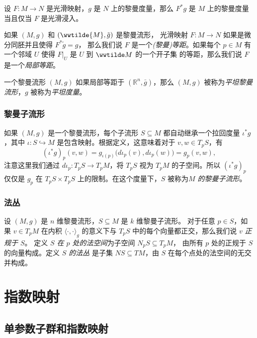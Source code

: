 \documentclass[fontset=none]{Notes}
\begin{document}
\begin{proposition}[拉回度量判别法]
  设 $F:M\to N$ 是光滑映射，$g$ 是 $N$ 上的黎曼度量，那么 
  $F^*g$ 是 $M$ 上的黎曼度量当且仅当 $F$ 是光滑浸入。
\end{proposition}

如果 $(M,g)$ 和 $(\wwtilde{M},\tilde g)$ 是黎曼流形，
光滑映射 $F:M\to N$ 如果是微分同胚并且使得 $F^*\tilde g=g$，
那么我们说 $F$ 是一个\emph{(黎曼)等距}。如果每个 $p\in M$
有一个邻域 $U$ 使得 $F|_U$ 是 $U$ 到 $\wwtilde M$ 的一个开子集
的等距，那么我们说 $F$ 是一个\emph{局部等距}。

一个黎曼流形 $(M,g)$ 如果局部等距于 $(\mathbb{R}^n,\bar g)$，那么
$(M,g)$ 被称为\emph{平坦黎曼流形}，$g$ 被称为\emph{平坦度量}。

\subsection{黎曼子流形}

如果 $(M,g)$ 是一个黎曼流形，每个子流形 $S\subseteq M$
都自动继承一个拉回度量 $\iota^*g$，其中 $\iota:S\hookrightarrow M$
是包含映射。根据定义，这意味着对于 $v,w\in T_pS$，有
\[
  (\iota^*g)_p(v,w)=g_{\iota(p)}\bigl(d\iota_p(v),d\iota_p(w)\bigr)
  =g_p(v,w),
\]
注意这里我们通过 $d\iota_p:T_pS\to T_pM$，将 $T_pS$ 视为 $T_pM$
的子空间。所以 $(\iota^*g)_p$ 仅仅是 $g_p$ 在 $T_pS\times T_pS$
上的限制。在这个度量下，$S$ 被称为\emph{$M$ 的黎曼子流形}。

\subsection{法丛}

设 $(M,g)$ 是 $n$ 维黎曼流形，$S\subseteq M$ 是 $k$ 维黎曼子流形。
对于任意 $p\in S$，如果 $v\in T_pM$ 在内积 $\langle\cdot,\cdot\rangle_g$
的意义下与 $T_pS$ 中的每个向量都正交，那么我们说 $v$ \emph{正规于 $S$}。
定义 \emph{$S$ 在 $p$ 处的法空间}为子空间 $N_pS\subseteq T_pM$，
由所有 $p$ 处的正规于 $S$ 的向量构成。定义 \emph{$S$ 的法丛}
是子集 $NS\subseteq TM$，由 $S$ 在每个点处的法空间的无交并构成。


\chapter{指数映射}

\section{单参数子群和指数映射}
\end{document}
